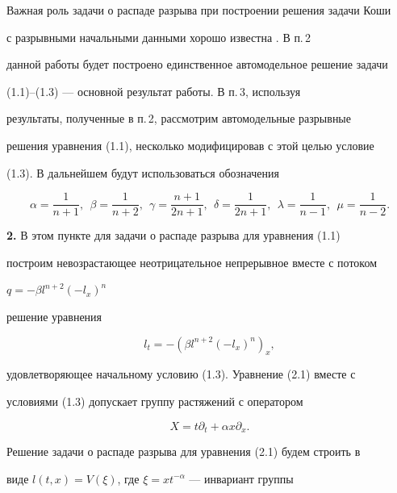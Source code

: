 Важная роль задачи о распаде разрыва при построении решения задачи Коши 


с разрывными начальными данными хорошо известна \cite{4}. В п.\,2 


данной работы будет построено единственное автомодельное решение задачи 


(1.1)--(1.3) --- основной результат работы. В п.\,3, используя 


результаты, полученные в п.\,2, рассмотрим автомодельные разрывные 


решения уравнения (1.1), несколько модифицировав с этой целью условие 


(1.3). В дальнейшем будут использоваться обозначения 


$$ 


\alpha=\frac{1}{n+1},\ \ \beta=\frac{1}{n+2}, 


\ \ \gamma=\frac{n+1}{2n+1},\ \ \delta=\frac{1}{2n+1}, 


\ \ \lambda=\frac{1}{n-1},\ \ \mu=\frac{1}{n-2}. 


$$ 


 


{\bf 2.} В этом пункте для задачи о распаде разрыва для уравнения (1.1) 


построим невозрастающее неотрицательное непрерывное вместе с потоком 


$q=-\beta l^{n+2}(-l_x)^n$ 


решение уравнения 


\begin{equation} 


l_t=-(\beta l^{n+2}(-l_x)^n)_x,\tag{2.1} 


\end{equation} 


удовлетворяющее начальному условию (1.3). Уравнение (2.1) вместе с 


условиями (1.3) допускает группу растяжений с оператором 


\begin{equation} 


X=t\partial_t+\alpha x\partial_x.\tag{2.2} 


\end{equation} 


 


Решение задачи о распаде разрыва для уравнения (2.1) будем строить в 


виде $l(t,x)=V(\xi)$, где $\xi=x t^{-\alpha}$ --- инвариант группы 


